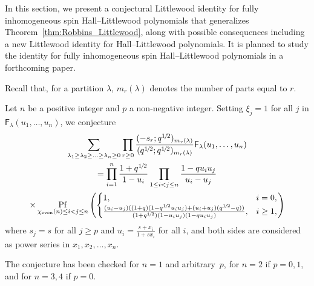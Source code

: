 \documentclass[ALCO, Unicode]{cedram}
\newcommand{\half}{1\mkern-2mu/\mkern-2mu2}
\DeclareMathOperator*{\pf}{Pf}
\newcommand{\F}{\mathsf{F}}
\begin{document}
	In this section, we present a conjectural Littlewood identity for fully inhomogeneous spin Hall--Littlewood polynomials that generalizes Theorem~\ref{thm:Robbins_Littlewood}, along with possible consequences including a new Littlewood identity for Hall--Littlewood polynomials. It is planned to study the identity for fully inhomogeneous spin Hall--Littlewood polynomials in a forthcoming paper.
	
	Recall that, for a partition $\lambda$, $m_r(\lambda)$ denotes the number of parts equal to $r$. 
	
	
	\begin{conj} 
		\label{conj:fully} 
		Let $n$ be a positive integer and $p$ a non-negative integer. Setting  
		$\xi_j=1$ for all $j$ in $\F_{\lambda}(u_1,\ldots,u_n)$, we conjecture
		\begin{multline} 
			\label{conjid:fully}
			\sum_{\lambda_1 \ge \lambda_2 \ge \ldots \ge \lambda_n \ge 0} 
			\prod_{r \ge 0} \frac{(-s_r;q^{\half})_{m_r(\lambda)}}{(q^{\half};q^{\half})_{m_r(\lambda)}} \F_{\lambda}(u_1,\ldots,u_n)\\
			=  \prod_{i=1}^{n} \frac{1+q^{\half}}{1- u_i}
			\prod_{1 \le i < j \le n} \frac{1-q  u_i u_j}{u_i-u_j} \\
			\times \pf_{\chi_{\mathrm{even}}(n) \le i < j \le n} \left(
			\begin{cases}
				1, & i=0,\\
				\frac{(u_i-u_j)((1+q)(1- q^{\half} u_i u_j) + (u_i + u_j)(q^{\half}- q))}{(1+q^{\half})(1- u_i u_j)(1- q u_i u_j)},& i\ge 1,
			\end{cases} \right) 
		\end{multline}
		where $s_j=s$ for all $j \ge p$ and $u_i = \frac{s+x_i}{1 + s x_i}$ for all $i$, and both sides are considered as power series in $x_1,x_2,\ldots,x_n$.
	\end{conj} 
	The conjecture has been checked for $n=1$ and arbitrary~$p$, for $n=2$ if $p=0,1$, and for $n=3,4$ if $p=0$. 
	
\end{document}
